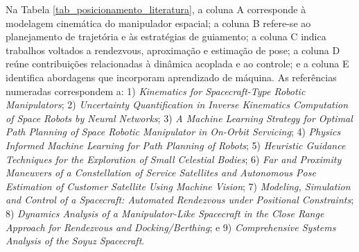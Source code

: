 Na Tabela \ref{tab_posicionamento_literatura}, a coluna A corresponde à modelagem cinemática do manipulador espacial;
a coluna B refere-se ao planejamento de trajetória e às estratégias de guiamento;
a coluna C indica trabalhos voltados a rendezvous, aproximação e estimação de pose;
a coluna D reúne contribuições relacionadas à dinâmica acoplada e ao controle;
e a coluna E identifica abordagens que incorporam aprendizado de máquina.
As referências numeradas correspondem a: 1) \textit{Kinematics for Spacecraft-Type Robotic Manipulators}; 2) \textit{Uncertainty Quantification in Inverse Kinematics Computation of Space Robots by Neural Networks}; 3) \textit{A Machine Learning Strategy for Optimal Path Planning of Space Robotic Manipulator in On-Orbit Servicing}; 4) \textit{Physics Informed Machine Learning for Path Planning of Robots}; 5) \textit{Heuristic Guidance Techniques for the Exploration of Small Celestial Bodies}; 6) \textit{Far and Proximity Maneuvers of a Constellation of Service Satellites and Autonomous Pose Estimation of Customer Satellite Using Machine Vision}; 7) \textit{Modeling, Simulation and Control of a Spacecraft: Automated Rendezvous under Positional Constraints}; 8) \textit{Dynamics Analysis of a Manipulator-Like Spacecraft in the Close Range Approach for Rendezvous and Docking/Berthing}; e 9) \textit{Comprehensive Systems Analysis of the Soyuz Spacecraft}.